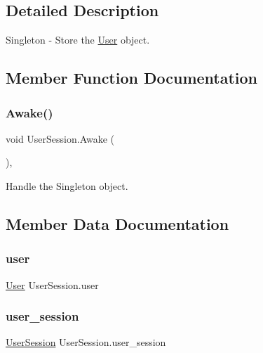\subsection{Detailed Description}
Singleton -\/ Store the \mbox{\hyperlink{class_user}{User}} object. 

\subsection{Member Function Documentation}
\mbox{\label{class_user_session_af727750c85b37856babe7fa27886aaab}} 
\subsubsection{\texorpdfstring{Awake()}{Awake()}}
{\footnotesize\ttfamily void User\+Session.\+Awake (\begin{DoxyParamCaption}{ }\end{DoxyParamCaption})\hspace{0.3cm}{\ttfamily [inline]}, {\ttfamily [private]}}



Handle the Singleton object. 



\subsection{Member Data Documentation}
\mbox{\label{class_user_session_ac49138881aafd0ea64d7e73b1beb7eb5}} 
\subsubsection{\texorpdfstring{user}{user}}
{\footnotesize\ttfamily \mbox{\hyperlink{class_user}{User}} User\+Session.\+user}

\mbox{\label{class_user_session_aa2651c5c9a3108e8a545c100a16387a1}} 
\subsubsection{\texorpdfstring{user\_session}{user\_session}}
{\footnotesize\ttfamily \mbox{\hyperlink{class_user_session}{User\+Session}} User\+Session.\+user\+\_\+session\hspace{0.3cm}{\ttfamily [static]}}



